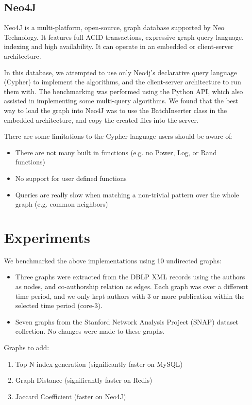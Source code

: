 \subsection{Neo4J}
Neo4J is a multi-platform, open-source, graph database supported by Neo
Technology. It features full ACID transactions, expressive graph query
language, indexing and high availability. It can operate in an embedded or
client-server architecture. 

In this database, we attempted to use only Neo4j's declarative query language
(Cypher) to implement the algorithms, and the client-server architecture to run
them with. The benchmarking was performed using the Python API, which also
assisted in implementing some multi-query algorithms. We found that the best
way to load the graph into Neo4J was to use the BatchInserter class in the
embedded architecture, and copy the created files into the server. 

There are some limitations to the Cypher language users should be aware of:
\begin{itemize}
\item There are not many built in functions (e.g. no Power, Log, or Rand
  functions) 
\item No support for user defined functions
\item Queries are really slow when matching a non-trivial pattern over the whole
graph (e.g. common neighbors)  
\end{itemize}

\section{Experiments}
We benchmarked the above implementations using 10 undirected graphs:
\begin{itemize}
\item Three graphs were extracted from the DBLP XML records using the authors as
nodes, and co-authorship relation as edges. Each graph was over a different
time period, and  we only kept authors with 3 or more publication within the
selected time period (core-3). 

\item Seven graphs from the Stanford Network Analysis Project (SNAP) dataset
  collection. No changes were made to these graphs.
\end{itemize}

Graphs to add:
\begin{enumerate}
\item Top N index generation (significantly faster on MySQL)
\item Graph Distance (significantly faster on Redis)
\item Jaccard Coefficient (faster on Neo4J)
\end{enumerate}

